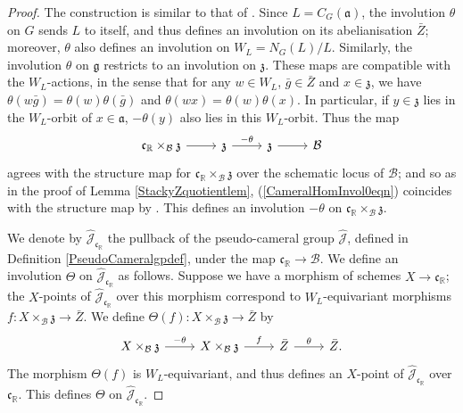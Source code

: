 \documentclass{amsart}
\theoremstyle{remark}
\numberwithin{theorem}{section}
\numberwithin{equation}{section}
\begin{document}
\begin{proof} 
The construction is similar to that of \cite[Proposition 20]{GPPN}. Since $L = C_G(\mathfrak{a})$, the involution $\theta$ on $G$ sends $L$ to itself, and thus defines an involution on its abelianisation $\bar{Z}$; moreover, $\theta$ also defines an involution on $W_L = N_G(L)/L$. Similarly, the involution $\theta$ on $\mathfrak{g}$ restricts to an involution on $\mathfrak{z}$. These maps are compatible with the $W_L$-actions, in the sense that for any $w \in W_L$, $\bar{g} \in \bar{Z}$ and $x \in \mathfrak{z}$, we have $\theta(w\bar{g})=\theta(w)\theta(\bar{g})$ and $\theta(wx) = \theta(w)\theta(x)$. In particular, if $y \in \mathfrak{z}$ lies in the $W_L$-orbit of $x \in \mathfrak{a}$, $-\theta(y)$ also lies in this $W_L$-orbit. Thus the map
\begin{equation}\label{CameralHomInvol0eqn}
\begin{tikzcd}
\mathfrak{c}_\mathbb{R} \times_\mathcal B \mathfrak{z} \arrow[r] & \mathfrak{z} \arrow[r, "-\theta"] & \mathfrak{z} \arrow[r] & \mathcal B
\end{tikzcd}
\end{equation}
agrees with the structure map for $\mathfrak{c}_\mathbb{R} \times_\mathcal B \mathfrak{z}$ over the schematic locus of $\mathcal B$; and so as in the proof of Lemma \ref{StackyZquotientlem}, (\ref{CameralHomInvol0eqn}) coincides with the structure map by \cite[Proposition A.1]{FMN}. This defines an involution $-\theta$ on $\mathfrak{c}_\mathbb{R} \times_\mathcal B \mathfrak{z}$.

We denote by $\hat{\mathcal J}_{\mathfrak{c}_\mathbb{R}}$ the pullback of the pseudo-cameral group $\hat{\mathcal{J}}$, defined in Definition \ref{PseudoCameralgpdef}, under the map $\mathfrak{c}_\mathbb{R} \rightarrow \mathcal B$. We define an involution $\Theta$ on $\hat{\mathcal J}_{\mathfrak{c}_\mathbb{R}}$ as follows. Suppose we have a morphism of schemes $X \rightarrow \mathfrak{c}_\mathbb{R}$; the $X$-points of $\hat{\mathcal J}_{\mathfrak{c}_\mathbb{R}}$ over this morphism correspond to $W_L$-equivariant morphisms $f:X \times_{\mathcal B}\mathfrak{z} \rightarrow \bar{Z}$. We define $\Theta(f):X \times_{\mathcal B}\mathfrak{z} \rightarrow \bar{Z}$ by
\begin{equation}\label{CameralHomInvol2eqn}
\begin{tikzcd}
X \times_{\mathcal B}\mathfrak{z} \arrow[r, "-\theta"] & X \times_{\mathcal B}\mathfrak{z} \arrow[r, "f"] & \bar{Z} \arrow[r, "\theta"] & \bar{Z}.
\end{tikzcd}
\end{equation}
The morphism $\Theta(f)$ is $W_L$-equivariant, and thus defines an $X$-point of $\hat{\mathcal J}_{\mathfrak{c}_\mathbb{R}}$ over $\mathfrak{c}_\mathbb{R}$. This defines $\Theta$ on $\hat{\mathcal J}_{\mathfrak{c}_\mathbb{R}}$.


\end{proof}
\end{document}
